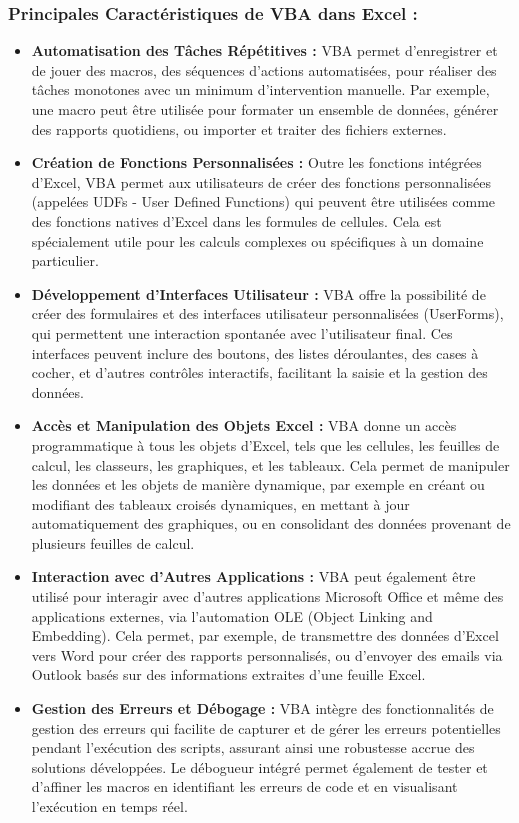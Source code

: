 \documentclass[a4paper, oneside, 12pt, final]{extreport}
\begin{document}
\subsubsection{Principales Caractéristiques de VBA dans Excel :}
\begin{itemize}
\item \textbf{Automatisation des Tâches Répétitives :} VBA permet d'enregistrer et de jouer des macros, des séquences d'actions automatisées, pour réaliser des tâches monotones avec un minimum d'intervention manuelle. Par exemple, une macro peut être utilisée pour formater un ensemble de données, générer des rapports quotidiens, ou importer et traiter des fichiers externes.

\item \textbf{Création de Fonctions Personnalisées :} Outre les fonctions intégrées d'Excel, VBA permet aux utilisateurs de créer des fonctions personnalisées (appelées UDFs - User Defined Functions) qui peuvent être utilisées comme des fonctions natives d'Excel dans les formules de cellules. Cela est spécialement utile pour les calculs complexes ou spécifiques à un domaine particulier.

\item \textbf{Développement d'Interfaces Utilisateur :} VBA offre la possibilité de créer des formulaires et des interfaces utilisateur personnalisées (UserForms), qui permettent une interaction spontanée avec l'utilisateur final. Ces interfaces peuvent inclure des boutons, des listes déroulantes, des cases à cocher, et d'autres contrôles interactifs, facilitant la saisie et la gestion des données.

\item \textbf{Accès et Manipulation des Objets Excel :} VBA donne un accès programmatique à tous les objets d'Excel, tels que les cellules, les feuilles de calcul, les classeurs, les graphiques, et les tableaux. Cela permet de manipuler les données et les objets de manière dynamique, par exemple en créant ou modifiant des tableaux croisés dynamiques, en mettant à jour automatiquement des graphiques, ou en consolidant des données provenant de plusieurs feuilles de calcul.

\item \textbf{Interaction avec d'Autres Applications :} VBA peut également être utilisé pour interagir avec d'autres applications Microsoft Office et même des applications externes, via l'automation OLE (Object Linking and Embedding). Cela permet, par exemple, de transmettre des données d'Excel vers Word pour créer des rapports personnalisés, ou d'envoyer des emails via Outlook basés sur des informations extraites d'une feuille Excel.

\item \textbf{Gestion des Erreurs et Débogage :} VBA intègre des fonctionnalités de gestion des erreurs qui facilite de capturer et de gérer les erreurs potentielles pendant l'exécution des scripts, assurant ainsi une robustesse accrue des solutions développées. Le débogueur intégré permet également de tester et d'affiner les macros en identifiant les erreurs de code et en visualisant l'exécution en temps réel.
\end{itemize}
\end{document}
